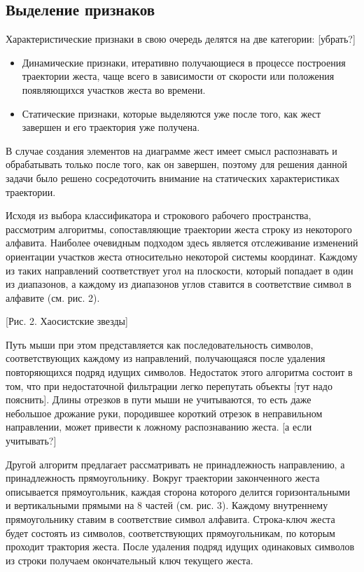 \documentclass[a5paper]{article}
\begin{document}
\subsection{Выделение признаков}
Характеристические признаки в свою очередь делятся на две категории: [убрать?]
\begin{itemize}
  \item Динамические признаки, итеративно получающиеся в процессе построения траектории жеста, чаще всего в зависимости от скорости или 
положения появляющихся участков жеста во времени.
  \item Статические признаки, которые выделяются уже после того, как жест завершен и его траектория уже получена.
\end{itemize}
В случае создания элементов на диаграмме жест имеет смысл распознавать и обрабатывать только после того, как он завершен, поэтому
для решения данной задачи было решено сосредоточить внимание на статических характеристиках траектории. 

Исходя из выбора классификатора и строкового рабочего пространства, рассмотрим алгоритмы, сопоставляющие траектории жеста строку из 
некоторого алфавита. Наиболее очевидным подходом здесь является отслеживание изменений ориентации участков жеста относительно некоторой 
системы координат. Каждому из таких направлений соответствует угол на плоскости, который попадает в 
один из диапазонов, а каждому из диапазонов углов ставится в соответствие символ в алфавите (см. рис. 2). 

[Рис. 2. Хаосистские звезды]

Путь мыши при этом представляется как последовательность символов, соответствующих каждому из направлений, получающаяся после удаления 
повторяющихся подряд идущих символов. Недостаток этого алгоритма состоит в том, что при недостаточной фильтрации легко перепутать объекты 
[тут надо пояснить]. Длины отрезков в пути мыши не учитываются, то есть даже небольшое дрожание руки, породившее короткий отрезок в 
неправильном направлении, может привести к ложному распознаванию жеста. [а если учитывать?]

Другой алгоритм предлагает рассматривать не принадлежность направлению, а принадлежность прямоугольнику. Вокруг траектории законченного жеста 
описывается прямоугольник, каждая сторона которого делится горизонтальными и вертикальными прямыми на 8 частей (см. рис. 3). Каждому внутреннему 
прямоугольнику ставим в соответствие символ алфавита. Строка-ключ жеста будет состоять из символов, соответствующих прямоугольникам, по
которым проходит трактория жеста. После удаления подряд идущих одинаковых символов из строки получаем окончательный ключ текущего жеста. 
\end{document}
